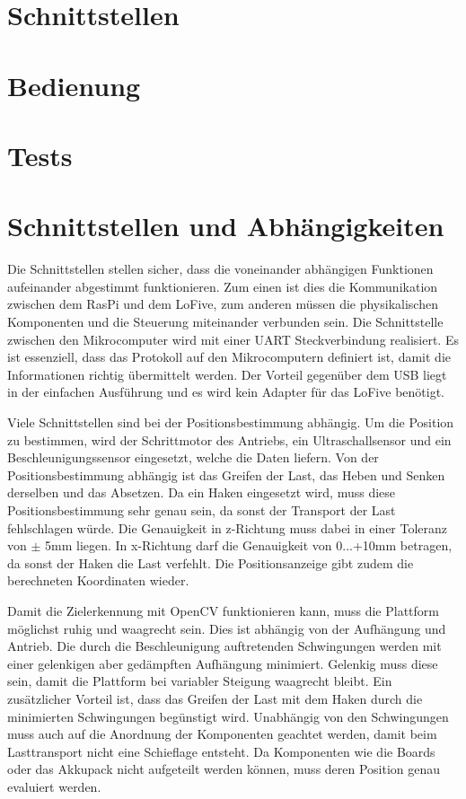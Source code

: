 \documentclass[a4paper]{report}
\begin{document}
\section{Schnittstellen}
\label{sec:Schnittstellen}

\section{Bedienung}
\label{sec:Bedienung}

\section{Tests}
\label{sec:TestsPrototyp}

\section{Schnittstellen und Abhängigkeiten}
\label{sec:SchnittAbhang}

Die Schnittstellen stellen sicher, dass die voneinander abhängigen Funktionen aufeinander abgestimmt funktionieren. Zum einen ist dies die Kommunikation zwischen dem RasPi und dem LoFive, zum anderen müssen die physikalischen Komponenten und die Steuerung miteinander verbunden sein. Die Schnittstelle zwischen den Mikrocomputer wird mit einer UART Steckverbindung realisiert. Es ist essenziell, dass das Protokoll auf den Mikrocomputern definiert ist, damit die Informationen richtig übermittelt werden. Der Vorteil gegenüber dem USB liegt in der einfachen Ausführung und es wird kein Adapter für das LoFive benötigt.

Viele Schnittstellen sind bei der Positionsbestimmung abhängig. Um die Position zu bestimmen, wird der Schrittmotor des Antriebs, ein Ultraschallsensor und ein Beschleunigungssensor eingesetzt, welche die Daten liefern. Von der Positionsbestimmung abhängig ist das Greifen der Last, das Heben und Senken derselben und das Absetzen. Da ein Haken eingesetzt wird, muss diese Positionsbestimmung sehr genau sein, da sonst der Transport der Last fehlschlagen würde. Die Genauigkeit in z-Richtung muss dabei in einer Toleranz von $\pm$ 5mm liegen. In x-Richtung darf die Genauigkeit von 0...+10mm betragen, da sonst der Haken die Last verfehlt. Die Positionsanzeige gibt zudem die berechneten Koordinaten wieder.

Damit die Zielerkennung mit OpenCV funktionieren kann, muss die Plattform möglichst ruhig und waagrecht sein. Dies ist abhängig von der Aufhängung und Antrieb. Die durch die Beschleunigung auftretenden Schwingungen werden mit einer gelenkigen aber gedämpften Aufhängung minimiert. Gelenkig muss diese sein, damit die Plattform bei variabler Steigung waagrecht bleibt. Ein zusätzlicher Vorteil ist, dass das Greifen der Last mit dem Haken durch die minimierten Schwingungen begünstigt wird. Unabhängig von den Schwingungen muss auch auf die Anordnung der Komponenten geachtet werden, damit beim Lasttransport nicht eine Schieflage entsteht. Da Komponenten wie die Boards oder das Akkupack nicht aufgeteilt werden können, muss deren Position genau evaluiert werden.
\end{document}
